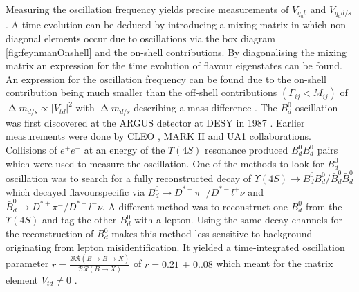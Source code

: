 Measuring the oscillation frequency yields precise measurements of $V_{q_u b}$ and $V_{q_u d/s}$.
A time evolution can be deduced by introducing a mixing matrix in which non-diagonal elements occur due to oscillations via the box diagram \ref{fig:feynmanOnshell} and the on-shell contributions.
By diagonalising the mixing matrix an expression for the time evolution of flavour eigenstates can be found.
An expression for the oscillation frequency can be found due to the on-shell contribution being much smaller than the off-shell contributions $(\Gamma_{ij}<M_{ij})$ of $\upDelta m_{d/s}\propto |V_{td}|^2$ with $\upDelta m_{d/s}$ describing a mass difference \cite{artuso2019cp}.
The $B_d^0$ oscillation was first discovered at the ARGUS detector at DESY in 1987 \cite{ALBRECHT1987245}.
Earlier measurements were done by CLEO \cite{PhysRevLett.58.183}, MARK II \cite{SCHAAD1985188} and UA1 \cite{ALBAJAR1987247} collaborations.
Collisions of $e^+e^-$ at an energy of the $\Upsilon(4S)$ resonance produced $B^0_dB^0_d$ pairs which were used to measure the oscillation.
One of the methods to look for $B_d^0$ oscillation was to search for a fully reconstructed decay of $\Upsilon(4S)\rightarrow B^0_dB^0_d /\bar B^0_d\bar B^0_d$ which decayed flavourspecific via $B_d^0\rightarrow D^{*-}\pi^+/D^{*-}l^+\nu$ and  $\bar B_d^0\rightarrow D^{*+}\pi^-/D^{*+}l^-\nu$.
A different method was to reconstruct one $B_d^0$ from the $\Upsilon(4S)$ and tag the other $B_d^0$ with a lepton.
Using the same decay channels for the reconstruction of $B_d^0$ makes this method less sensitive to background originating from lepton misidentification.
It yielded a time-integrated oscillation parameter $r= \frac{\mathcal{BR}(B\rightarrow \bar B\rightarrow \bar X)}{\mathcal{BR}(B\rightarrow X)}$ of $r=\num{0.21(0.08)}$ which meant for the matrix element $V_{td}\neq 0$ \cite{ALBRECHT1987245}.

